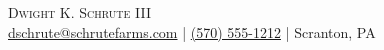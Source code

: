 \begin{center}
	{\Huge \scshape {Dwight K. Schrute III}}\\
	\href{mailto:dschrute@schrutefarms.com}{dschrute@schrutefarms.com} | \href{tel:(570) 555-1212}{(570) 555-1212} | Scranton, PA\\
\end{center}